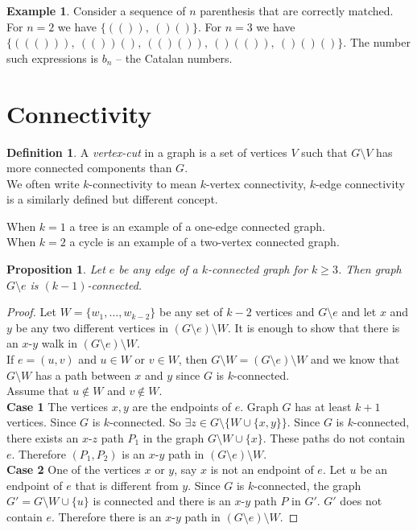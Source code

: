 \documentclass{article}
\newtheorem*{prop}{Proposition}
\theoremstyle{definition}
\newtheorem*{defn}{Definition}
\newtheorem*{ex}{Example}
\begin{document}
\begin{ex}
Consider a sequence of $n$ parenthesis that are correctly matched.
For $n=2$ we have $\{(()),\ ()()\}$.
For $n=3$ we have $\{((())),\ (())(),\ (()()),\ ()(()),\ ()()()\}$.
The number such expressions is $b_n$ -- the Catalan numbers.
\end{ex}

\section{Connectivity}

\begin{defn}
A \emph{vertex-cut} in a graph is a set of vertices $V$ such that $G\setminus V$ has more connected components than $G$. \\
We often write $k$-connectivity to mean $k$-vertex connectivity, $k$-edge connectivity is a similarly defined but different concept.
\end{defn}

When $k=1$ a tree is an example of a one-edge connected graph.\\
When $k=2$ a cycle is an example of a two-vertex connected graph.

\begin{prop}
Let $e$ be any edge of a $k$-connected graph for $k\ge 3$.
Then graph $G\setminus e$ is $(k-1)$-connected.
\end{prop}

\begin{proof}
Let $W=\{w_1,\ldots,w_{k-2}\}$ be any set of $k-2$ vertices and $G\setminus e$ and let $x$ and $y$ be any two different vertices in $(G\setminus e)\setminus W$.
It is enough to show that there is an $x$-$y$ walk in $(G\setminus e)\setminus W$. \\
If $e=(u,v)$ and $u\in W$ or $v\in W$, then $G\setminus W = (G\setminus e) \setminus W$ and we know that $G\setminus W$ has a path between $x$ and $y$ since $G$ is $k$-connected. \\
Assume that $u\not\in W$ and $v\not\in W$. \\
\textbf{Case 1} The vertices $x,y$ are the endpoints of $e$.
Graph $G$ has at least $k+1$ vertices.
Since $G$ is $k$-connected. 
So $\exists z\in G\setminus\{W\cup\{x,y\}\}$.
Since $G$ is $k$-connected, there exists an $x$-$z$ path $P_1$ in the graph $G\setminus W\cup\{x\}$.
These paths do not contain $e$.
Therefore $(P_1,P_2)$ is an $x$-$y$ path in $(G\setminus e)\setminus W$. \\
\textbf{Case 2} One of the vertices $x$ or $y$, say $x$ is not an endpoint of $e$.
Let $u$ be an endpoint of $e$ that is different from $y$.
Since $G$ is $k$-connected, the graph $G' = G\setminus W\cup\{u\}$ is connected and there is an $x$-$y$ path $P$ in $G'$.
$G'$ does not contain $e$.
Therefore there is an $x$-$y$ path in $(G\setminus e)\setminus W$.
\end{proof}
\end{document}
